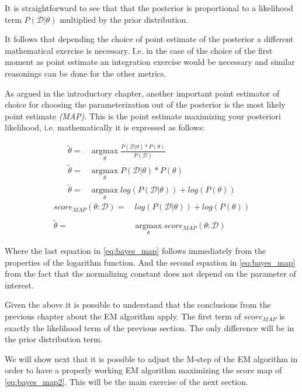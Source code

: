 \documentclass[11pt]{article}
\begin{document}
\begin{article}
It is straightforward to see that that the posterior is proportional
to a likelihood term \(P (\mathscr{D} | \theta)\) multiplied by the
prior distribution.

It follows that depending the choice of point estimate of the
posterior a different mathematical exercise is necessary. I.e. in
the case of the choice of the first moment as point estimate an
integration exercise would be necessary and similar reasonings can
be done for the other metrics.

As argued in the introductory chapter, another important point
estimator of choice for choosing the parameterization out of the
posterior is the most likely point estimate \emph{(MAP)}. This is the
point estimate maximizing your posteriori likelihood,
i.e. mathematically it is expressed as follows:

\begin{align} \label{eq:bayes_map}
\tilde{\theta} =& \operatorname*{argmax}_{\theta} \frac{P (\mathscr{D} | \theta) * P(\theta)}{P (\mathscr{D})} \nonumber\\
\tilde{\theta} =& \operatorname*{argmax}_{\theta} P (\mathscr{D} | \theta) * P(\theta)\\ 
\tilde{\theta} =& \operatorname*{argmax}_{\theta} log (P (\mathscr{D} | \theta)) + log (P(\theta)) \nonumber
\end{align}
\begin{align} \label{eq:bayes_map2}
score_{MAP} (\theta : \mathscr{D}) =& \ log (P (\mathscr{D} | \theta)) + log (P(\theta)) \nonumber\\
\nonumber\\
\tilde{\theta} =& \operatorname*{argmax}_{\theta} score_{MAP}(\theta : \mathscr{D}) 
\end{align}

Where the last equation in \ref{eq:bayes_map} follows immediately
from the properties of the logarithm function. And the second
equation in \ref{eq:bayes_map} from the fact that the normalizing
constant does not depend on the parameter of interest.

Given the above it is possible to understand that the conclusions
from the previous chapter about the EM algorithm apply. The first
term of \(score_{MAP}\) is exactly the likelihood term of the previous
section. The only difference will be in the prior distribution term.

We will show next that it is possible to adjust the M-step of the EM
algorithm in order to have a properly working EM algorithm
maximizing the score map of \ref{eq:bayes_map2}. This will be the main
exercise of the next section.


\end{article}
\end{document}
